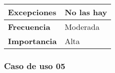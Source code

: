 \begin{tabularx}{\columnwidth}{l|l}
\begin{minipage}{0.25\columnwidth}
\textbf{Excepciones} 
\end{minipage}
&
\begin{minipage}{0.65\columnwidth}
No las hay
\end{minipage}
\\ \hline

\begin{minipage}{0.25\columnwidth}
\textbf{Frecuencia} 
\end{minipage}
&
\begin{minipage}{0.65\columnwidth}
Moderada
\end{minipage}
\\ \hline

\begin{minipage}{0.25\columnwidth}
\textbf{Importancia} 
\end{minipage}
&
\begin{minipage}{0.65\columnwidth}
Alta
\end{minipage}
\\ \hline
\end{tabularx}

\subsubsection{Caso de uso 05}

